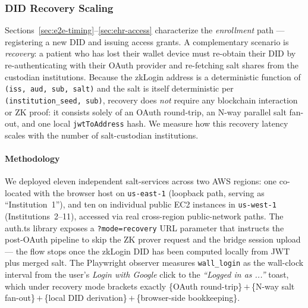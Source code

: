 %
%
%

\subsubsection{DID Recovery Scaling}
\label{sec:did-recovery}

Sections~\ref{sec:e2e-timing}--\ref{sec:ehr-access} characterize the
\emph{enrollment} path — registering a new DID and issuing access
grants. A complementary scenario is \emph{recovery}: a patient who has
lost their wallet device must re-obtain their DID by re-authenticating
with their OAuth provider and re-fetching salt shares from the
custodian institutions. Because the zkLogin address is a deterministic
function of \texttt{(iss, aud, sub, salt)} and the salt is itself
deterministic per \texttt{(institution\_seed, sub)}, recovery does
\emph{not} require any blockchain interaction or ZK proof: it consists
solely of an OAuth round-trip, an N-way parallel salt fan-out, and one
local \texttt{jwtToAddress} hash. We measure how this recovery latency
scales with the number of salt-custodian institutions.

\paragraph{Methodology}

We deployed eleven independent salt-services across two AWS regions: one
co-located with the browser host on \texttt{us-east-1} (loopback path,
serving as ``Institution~1''), and ten on individual public EC2 instances
in \texttt{us-west-1} (Institutions~2--11), accessed via real cross-region
public-network paths. The auth.ts library exposes a \texttt{?mode=recovery}
URL parameter that instructs the post-OAuth pipeline to skip the ZK
prover request and the bridge session upload — the flow stops once the
zkLogin DID has been computed locally from JWT plus merged salt. The
Playwright observer measures \texttt{wall\_login} as the wall-clock
interval from the user's \emph{Login with Google} click to the
\emph{``Logged in as ...''} toast, which under recovery mode brackets
exactly \{OAuth round-trip\}\,$+$\,\{N-way salt fan-out\}\,$+$\,\{local DID
derivation\}\,$+$\,\{browser-side bookkeeping\}.


